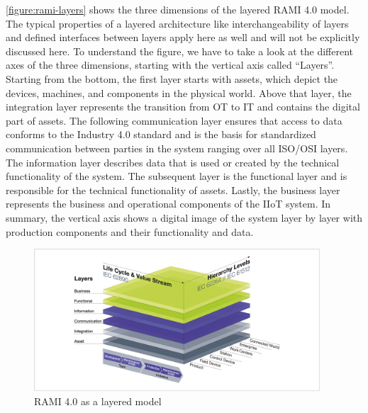         \noindent \autoref{figure:rami-layers} shows the three dimensions of the layered RAMI 4.0 model. The typical properties of a layered architecture like interchangeability of layers and defined interfaces between layers apply here as well and will not be explicitly discussed here. To understand the figure, we have to take a look at the different axes of the three dimensions, starting with the vertical axis called ``Layers''. Starting from the bottom, the first layer starts with assets, which depict the devices, machines, and components in the physical world. Above that layer, the integration layer represents the transition from OT to IT and contains the digital part of assets. The following communication layer ensures that access to data conforms to the Industry 4.0 standard and is the basis for standardized communication between parties in the system ranging over all ISO/OSI layers. The information layer describes data that is used or created by the technical functionality of the system. The subsequent layer is the functional layer and is responsible for the technical functionality of assets. Lastly, the business layer represents the business and operational components of the IIoT system. In summary, the vertical axis shows a digital image of the system layer by layer with production components and their functionality and data.
        
        \begin{figure}[htbp]
            \centering
            \includegraphics[width=0.95\textwidth]{img/rami40-ebenenmodell.png}
            \caption{RAMI 4.0 as a layered model \cite{rami_img_source}}
            \label{figure:rami-layers}
        \end{figure}

